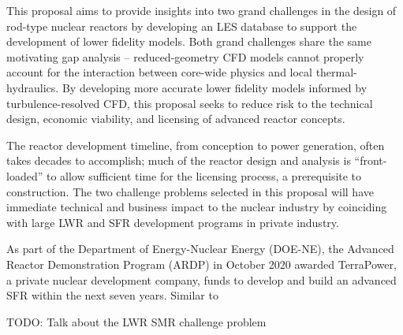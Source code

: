 \documentclass[11pt,letterpaper,english]{article}
\begin{document}
This proposal aims to provide insights into two grand challenges in the design of rod-type nuclear reactors by developing an LES database to support the development of lower fidelity models. Both grand challenges share the same motivating gap analysis -- reduced-geometry CFD models cannot properly account for the interaction between core-wide physics and local thermal-hydraulics. By developing more accurate lower fidelity models informed by turbulence-resolved CFD, this proposal seeks to reduce risk to the technical design, economic viability, and licensing of advanced reactor concepts. 

The reactor development timeline, from conception to power generation, often takes decades to accomplish; much of the reactor design and analysis is ``front-loaded'' to allow sufficient time for the licensing process, a prerequisite to construction. The two challenge problems selected in this proposal will have immediate technical and business impact to the nuclear industry by coinciding with large LWR and SFR development programs in private industry.

As part of the Department of Energy-Nuclear Energy (DOE-NE), the Advanced Reactor Demonstration Program (ARDP) in October 2020 awarded TerraPower, a private nuclear development company, funds to develop and build an advanced SFR within the next seven years. Similar to 










TODO: Talk about the LWR SMR challenge problem

\end{document}
